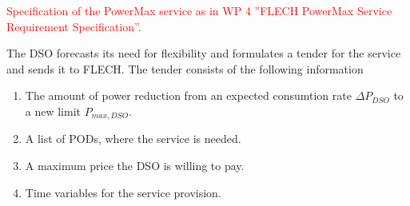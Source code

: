 \textcolor{red}{Specification of the PowerMax service as in WP 4 ''FLECH PowerMax Service Requirement Specification''.}

The DSO forecasts its need for flexibility and formulates a tender for the service and sends it to FLECH. The tender consists of the following information

\begin{enumerate}
\item The amount of power reduction from an expected consumtion rate $\Delta P_{DSO}$ to a new limit $P_{max,DSO}$.
\item A list of PODs, where the service is needed.
\item A maximum price the DSO is willing to pay.
\item Time variables for the service provision.
\end{enumerate}